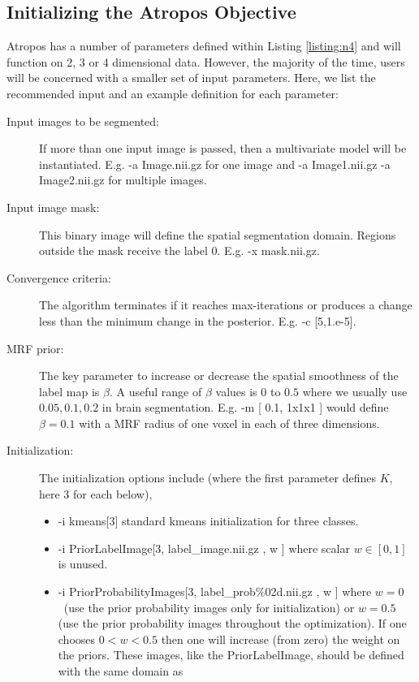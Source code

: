 \documentclass[11pt,english]{article}
\begin{document}
\subsection{Initializing the Atropos Objective}
Atropos has a number of parameters defined within
Listing \ref{listing:n4} and will function on 2, 3 or 4 dimensional
data.  However, the majority of the time, users will be concerned with
a smaller set of input parameters.  Here, we list the recommended input and
an example definition for each parameter:
\begin{description}
\item[Input images to be segmented:] If more than
  one input image is passed, then a multivariate model will be
  instantiated.  E.g.  {\ttfamily -a Image.nii.gz} for one image and
  {\ttfamily -a Image1.nii.gz -a Image2.nii.gz} for multiple images.
\item[Input image mask:] This binary image
  will define the spatial segmentation domain.  Regions outside the
  mask receive the label $0$.  E.g.  {\ttfamily -x mask.nii.gz}. 
\item[Convergence criteria:] The algorithm terminates if it reaches max-iterations or
  produces a change less than the minimum change in the posterior.
  E.g. {\ttfamily -c [5,1.e-5]}. 
\item[MRF prior:] The key parameter to increase or decrease the
  spatial smoothness of the label map is $\beta$.  A useful range of
  $\beta$ values is $0$ to $0.5$ where we usually use $0.05, 0.1, 0.2$
  in brain segmentation.  E.g.  {\ttfamily -m [ 0.1, 1x1x1 ]} would
  define $\beta=0.1$ with a MRF radius of one voxel in each of three dimensions.
\item[Initialization:] The initialization options include (where the
  first parameter defines $K$, here 3 for each below),
\begin{itemize}
\item  {\ttfamily -i  kmeans[3]} standard kmeans initialization for
  three classes.
\item  {\ttfamily -i  PriorLabelImage[3, label\_image.nii.gz , w ]}
  where scalar $w \in [0,1]$ is unused. 
\item  {\ttfamily -i  PriorProbabilityImages[3, label\_prob\%02d.nii.gz ,
    w ]} where $w=0$~(use the prior probability images only for
  initialization) or $w=0.5$ (use the prior probability images
  throughout the optimization).  If one chooses $0 < w < 0.5$ then one
  will increase (from zero) the weight on the priors.  These images,
  like the PriorLabelImage, should be defined with the same domain as

\end{itemize}
\end{description}
\end{document}
